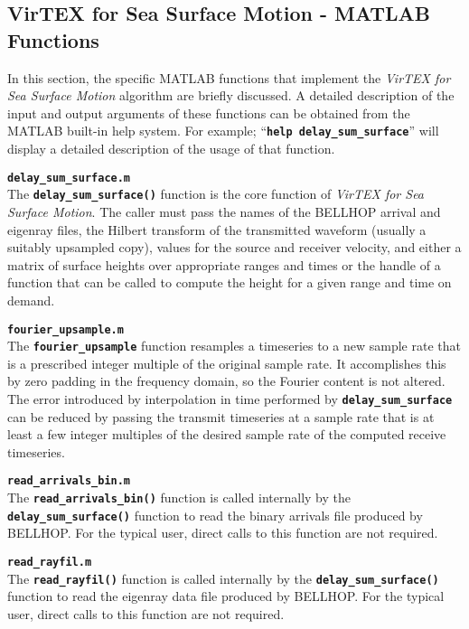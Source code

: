 \documentclass[12pt, letterpaper, oneside]{article}
\begin{document}
\subsection{VirTEX for Sea Surface Motion - MATLAB Functions}
In this section, the specific MATLAB functions that implement the
{\em VirTEX for Sea Surface Motion} algorithm are briefly discussed. A
detailed description of the input and output arguments of these
functions can be obtained from the MATLAB built-in help system.
For example; ``{\tt \bf help delay\_sum\_surface}'' will display
a detailed description of the usage of that function.

\begin{description}
\item {\tt \bf delay\_sum\_surface.m}\hfill \\
The {\tt \bf delay\_sum\_surface()} function is the core function of
{\em VirTEX for Sea Surface Motion}. The caller must pass the
names of the BELLHOP arrival and eigenray files, the Hilbert transform
of the transmitted waveform (usually a suitably upsampled copy), values for
the source and receiver velocity, and either a matrix of surface heights over
appropriate ranges and times or the handle of a function that can be called
to compute the height for a given range and time on demand. 

\item {\tt \bf fourier\_upsample.m}\hfill \\
The {\tt \bf fourier\_upsample} function resamples a timeseries
to a new sample rate that is a prescribed integer multiple of the original
sample rate. It accomplishes this by zero padding in the frequency domain,
so the Fourier content is not altered. The error introduced by interpolation
in time performed by  {\tt \bf delay\_sum\_surface} can be reduced by
passing the transmit timeseries at a sample rate that is at least a
few integer multiples of the desired sample rate of the computed
receive timeseries.

\item {\tt \bf read\_arrivals\_bin.m}\hfill \\
The {\tt \bf read\_arrivals\_bin()} function is called internally by the
{\tt \bf delay\_sum\_surface()} function to read the binary arrivals file
produced by BELLHOP. For the typical user, direct calls to this function
are not required.

\item {\tt \bf read\_rayfil.m}\hfill \\
The {\tt \bf read\_rayfil()} function is called internally by the
{\tt \bf delay\_sum\_surface()} function to read the eigenray data file
produced by BELLHOP. For the typical user, direct calls to this function
are not required.

\end{description}
\end{document}
